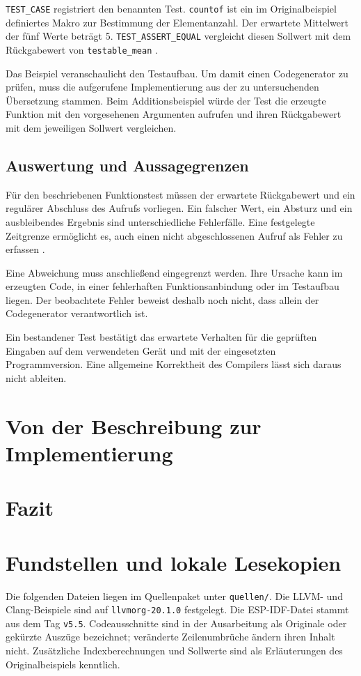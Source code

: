 \documentclass[11pt,a4paper]{article}
\newcommand{\code}[1]{\texttt{#1}}
\begin{document}
\code{TEST\_CASE} registriert den benannten Test.
\code{countof} ist ein im Originalbeispiel definiertes Makro zur
Bestimmung der Elementanzahl. Der erwartete Mittelwert der fünf
Werte beträgt 5. \code{TEST\_ASSERT\_EQUAL} vergleicht diesen Sollwert
mit dem Rückgabewert von \code{testable\_mean} \cite{espmean}.

Das Beispiel veranschaulicht den Testaufbau. Um damit einen
Codegenerator zu prüfen, muss die aufgerufene Implementierung aus
der zu untersuchenden Übersetzung stammen. Beim Additionsbeispiel
würde der Test die erzeugte Funktion mit den vorgesehenen
Argumenten aufrufen und ihren Rückgabewert mit dem jeweiligen
Sollwert vergleichen.

\subsection{Auswertung und Aussagegrenzen}
Für den beschriebenen Funktionstest müssen der erwartete Rückgabewert
und ein regulärer Abschluss des Aufrufs vorliegen. Ein falscher Wert,
ein Absturz und ein ausbleibendes Ergebnis sind unterschiedliche
Fehlerfälle. Eine festgelegte Zeitgrenze ermöglicht es, auch einen
nicht abgeschlossenen Aufruf als Fehler zu erfassen \cite{csmith}.

Eine Abweichung muss anschließend eingegrenzt werden. Ihre Ursache
kann im erzeugten Code, in einer fehlerhaften Funktionsanbindung
oder im Testaufbau liegen. Der beobachtete Fehler beweist deshalb
noch nicht, dass allein der Codegenerator verantwortlich ist.

Ein bestandener Test bestätigt das erwartete Verhalten für die
geprüften Eingaben auf dem verwendeten Gerät und mit der
eingesetzten Programmversion. Eine allgemeine Korrektheit des
Compilers lässt sich daraus nicht ableiten.

\section{Von der Beschreibung zur Implementierung}


\section{Fazit}

\clearpage\appendix
\section{Fundstellen und lokale Lesekopien}\label{sec:quellen}
Die folgenden Dateien liegen im Quellenpaket unter \code{quellen/}. Die LLVM- und Clang-Beispiele sind auf \code{llvmorg-20.1.0} festgelegt. Die ESP-IDF-Datei stammt aus dem Tag \code{v5.5}. Codeausschnitte sind in der Ausarbeitung als Originale oder gekürzte Auszüge bezeichnet; veränderte Zeilenumbrüche ändern ihren Inhalt nicht. Zusätzliche Indexberechnungen und Sollwerte sind als Erläuterungen des Originalbeispiels kenntlich.
\end{document}

